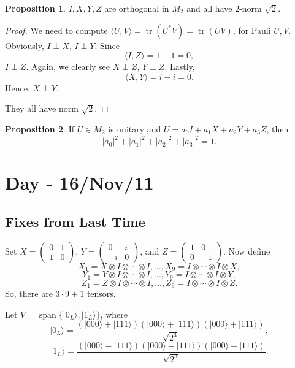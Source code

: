 \documentclass[12pt]{article}
\theoremstyle{definition}
\newtheorem*{proposition}{Proposition}
\DeclareMathOperator{\tr}{tr}
\begin{document}
\begin{proposition}
$I,X,Y,Z$ are orthogonal in $M_2$ and all have $2$-norm $\sqrt{2}$.
\end{proposition}

\begin{proof}
We need to compute $\langle U,V\rangle = \tr(U^*V)=\tr(UV)$, for Pauli $U,V$. Obviously, $I \perp X$, $I \perp Y$. Since
\[
\langle I,Z\rangle = 1-1=0,
\]
$I \perp Z$. Again, we clearly see $X \perp Z$, $Y \perp Z$. Lastly,
\[
\langle X,Y\rangle = i-i=0.
\]
Hence, $X \perp Y$.

They all have norm $\sqrt{2}$.
\end{proof}

\begin{proposition}
If $U \in M_2$ is unitary and $U=a_0I+a_1X+a_2Y+a_3Z$, then
\[
|a_0|^2+|a_1|^2+|a_2|^2+|a_3|^2=1.
\]
\end{proposition}

\section{Day - 16/Nov/11}

\subsection{Fixes from Last Time}

Set $X=\begin{pmatrix}0 & 1\\ 1 & 0\end{pmatrix}$, $Y=\begin{pmatrix}0 & i\\ -i & 0\end{pmatrix}$, and $Z=\begin{pmatrix}1 & 0\\ 0 & -1\end{pmatrix}$. Now define
\[
X_1=X \otimes I \otimes \cdots \otimes I, \ldots, X_9=I \otimes \cdots \otimes I \otimes X,
\]
\[
Y_1=Y \otimes I \otimes \cdots \otimes I, \ldots, Y_9=I \otimes \cdots \otimes I \otimes Y,
\]
\[
Z_1=Z \otimes I \otimes \cdots \otimes I, \ldots, Z_9=I \otimes \cdots \otimes I \otimes Z.
\]
So, there are $3\cdot 9+1$ tensors.

Let $V=\operatorname{span}\{|0_L\rangle,|1_L\rangle\}$, where
\[
|0_L\rangle = \frac{(|000\rangle+|111\rangle)(|000\rangle+|111\rangle)(|000\rangle+|111\rangle)}{\sqrt{2^3}},
\]
\[
|1_L\rangle = \frac{(|000\rangle-|111\rangle)(|000\rangle-|111\rangle)(|000\rangle-|111\rangle)}{\sqrt{2^3}}.
\]
\end{document}

